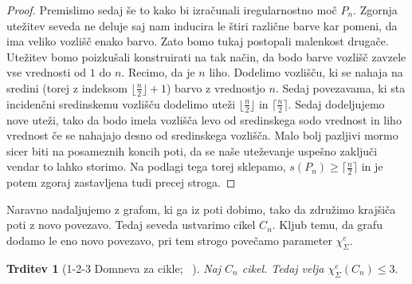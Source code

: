 \documentclass[12pt,a4paper,twoside]{article}
\theoremstyle{definition} %
\theoremstyle{plain} %
\newtheorem{trditev}[definicija]{Trditev}
\newcommand{\ec}{\chi_{\Sigma}^e}
\numberwithin{equation}{section}  %
\begin{document}
\begin{proof}
Premislimo sedaj še to kako bi izračunali iregularnostno moč $P_n$. Zgornja utežitev seveda ne deluje saj nam inducira le štiri različne barve kar pomeni, da ima veliko vozlišč enako barvo. Zato bomo tukaj postopali malenkost drugače. Utežitev bomo poizkušali konstruirati na tak način, da bodo barve vozlišč zavzele vse vrednosti od $1$ do $n$. Recimo, da je $n$ liho. Dodelimo vozlišču, ki se nahaja na sredini (torej z indeksom $\lfloor \frac{n}{2} \rfloor + 1$) barvo z vrednostjo $n$. Sedaj povezavama, ki sta incidenčni sredinskemu vozlišču dodelimo uteži $\lfloor \frac{n}{2} \rfloor$ in $\lceil \frac{n}{2} \rceil$. Sedaj dodeljujemo nove uteži, tako da bodo imela vozlišča levo od sredinskega sodo vrednost in liho vrednost če se nahajajo desno od sredinskega vozlišča. Malo bolj pazljivi mormo sicer biti na posameznih koncih poti, da se naše uteževanje uspešno zaključi vendar to lahko storimo. Na podlagi tega torej sklepamo, $s(P_n) \ge \lceil \frac{n}{2} \rceil$ in je potem zgoraj zastavljena tudi precej stroga.
\end{proof}
Naravno nadaljujemo z grafom, ki ga iz poti dobimo, tako da združimo krajšiča poti z novo povezavo. Tedaj seveda ustvarimo cikel $C_n$. Kljub temu, da grafu dodamo le eno novo povezavo, pri tem strogo povečamo parameter $\ec.$
\begin{trditev}[1-2-3 Domneva za cikle; ~\citet{examples}]
Naj $C_n$ cikel. Tedaj velja $\ec(C_n) \le 3.$
\end{trditev}
\end{document}
